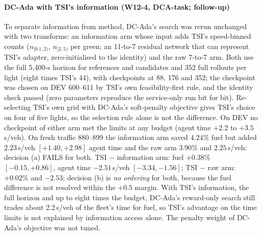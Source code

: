 \paragraph{DC-Ada with TSI's information (W12-4, DCA-task; follow-up)} To separate information from method, DC-Ada's search was rerun
unchanged with two transforms: an information arm whose input adds TSI's speed-binned counts ($n_{[0.1,2)}$, $n_{[2,5)}$ per green; an
11-to-7 residual network that can represent TSI's adapter, zero-initialised to the identity) and the raw 7-to-7 arm. Both use the full
5,400-s horizon for references and candidates and 352 full rollouts per light (eight times TSI's 44), with checkpoints at 88, 176 and 352;
the checkpoint was chosen on DEV 600--611 by TSI's own feasibility-first rule, and the identity check passed (zero parameters reproduce
the service-only run bit for bit). Re-selecting TSI's own grid with DC-Ada's soft-penalty objective gives TSI's choice on four of five
lights, so the selection rule alone is not the difference. On DEV no checkpoint of either arm met the limits at any budget (agent time
$+2.2$ to $+3.5$\,s/veh). On fresh traffic 880--899 the information arm saved $4.24\%$ fuel but added $2.23$\,s/veh $[+1.40,+2.98]$ agent
time and the raw arm $3.90\%$ and $2.25$\,s/veh: decision (a) FAILS for both. TSI $-$ information arm: fuel $+0.38\%$ $[-0.15,+0.86]$,
agent time $-2.51$\,s/veh $[-3.34,-1.56]$; TSI $-$ raw arm: $+0.02\%$ and $-2.53$; decision (b) is \emph{no ordering} for both, because
the fuel difference is not resolved within the $+0.5$ margin. With TSI's information, the full horizon and up to eight times the budget,
DC-Ada's reward-only search still trades about 2.2\,s/veh of the fleet's time for fuel, so TSI's advantage on the time limits is not
explained by information access alone. The penalty weight of DC-Ada's objective was not tuned.

